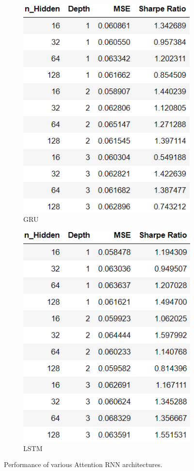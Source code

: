 \documentclass[11pt, letterpaper, headings=standardclasses]{scrartcl}
\begin{document}
\begin{figure}[H]
\begin{subfigure}{.33\textwidth}
      \includegraphics[width=.9\linewidth]{GRU_att.png}
      \caption{GRU}
      \label{fig:sub1}
    \end{subfigure}%
    \begin{subfigure}{.33\textwidth}
      \centering
      \includegraphics[width=.9\linewidth]{LSTM_att.png}
      \caption{LSTM}
      \label{fig:sub2}
    \end{subfigure}
    \caption{Performance of various Attention RNN architectures.}
    \label{fig:test}
    \end{figure}
	
\end{document}
